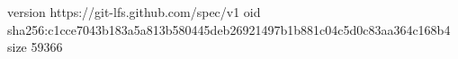 version https://git-lfs.github.com/spec/v1
oid sha256:c1cce7043b183a5a813b580445deb26921497b1b881c04c5d0c83aa364c168b4
size 59366
